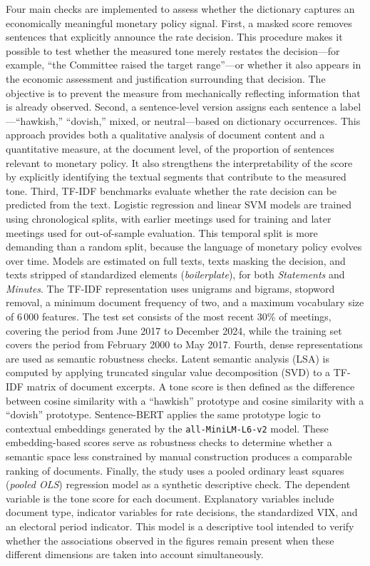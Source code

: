 \documentclass{article}
\begin{document}
Four main checks are implemented to assess whether the dictionary captures an economically meaningful monetary policy signal.
First, a masked score removes sentences that explicitly announce the rate decision. This procedure makes it possible to test whether the measured tone merely restates the decision—for example, 
``the Committee raised the target range''—or whether it also appears in the economic assessment and justification surrounding that decision. The objective is to prevent the measure from mechanically reflecting information that 
is already observed.
Second, a sentence-level version assigns each sentence a label—``hawkish,'' ``dovish,'' mixed, or neutral—based on dictionary occurrences. This approach provides both a qualitative analysis of document content and a 
quantitative measure, at the document level, of the proportion of sentences relevant to monetary policy. It also strengthens the interpretability of the score by explicitly identifying the textual segments that contribute to 
the measured tone.
Third, TF-IDF benchmarks evaluate whether the rate decision can be predicted from the text. Logistic regression and linear SVM models are trained using chronological splits, with earlier meetings used for training and later 
meetings used for out-of-sample evaluation. This temporal split is more demanding than a random split, because the language of monetary policy evolves over time. Models are estimated on full texts, texts masking the decision, 
and texts stripped of standardized elements (\textit{boilerplate}), for both \textit{Statements} and \textit{Minutes}. The TF-IDF representation uses unigrams and bigrams, stopword removal, a minimum document frequency of two, and 
a maximum vocabulary size of 6\,000 features. The test set consists of the most recent 30\% of meetings, covering the period from June 2017 to December 2024, while the training set covers the period from February 2000 to May 2017.
Fourth, dense representations are used as semantic robustness checks. Latent semantic analysis (LSA) is computed by applying truncated singular value decomposition (SVD) to a TF-IDF matrix of document excerpts. A tone score is 
then defined as the difference between cosine similarity with a ``hawkish'' prototype and cosine similarity with a ``dovish'' prototype. Sentence-BERT applies the same prototype logic to contextual embeddings generated by 
the \texttt{all-MiniLM-L6-v2} model. These embedding-based scores serve as robustness checks to determine whether a semantic space less constrained by manual construction produces a comparable ranking of documents.
Finally, the study uses a pooled ordinary least squares (\textit{pooled OLS}) regression model as a synthetic descriptive check. The dependent variable is the tone score for each document. Explanatory variables include 
document type, indicator variables for rate decisions, the standardized VIX, and an electoral period indicator. This model is a descriptive tool intended to verify whether the associations observed in the figures remain present 
when these different dimensions are taken into account simultaneously.
\end{document}
